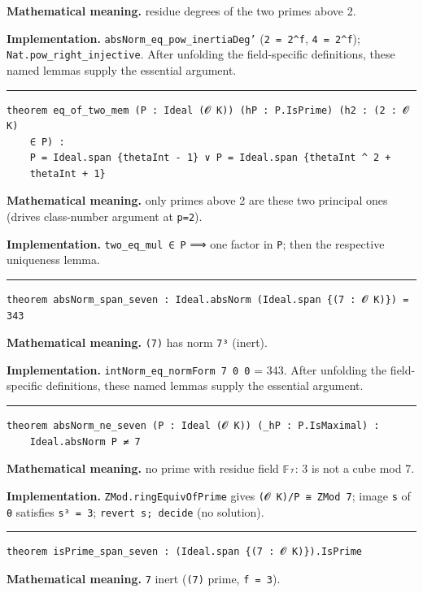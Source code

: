 \documentclass[UTF8,a4paper,11pt,fontset=fandol]{ctexart}
\theoremstyle{definition}
\newcommand{\statementsep}{\par\medskip\hrule\medskip}
\begin{document}
\noindent\textbf{Mathematical meaning.} residue degrees of the two primes above 2.\par
\noindent\textbf{Implementation.} \texttt{absNorm\_\allowbreak{}eq\_\allowbreak{}pow\_\allowbreak{}inertiaDeg'} (\texttt{2 = 2\textasciicircum{}f}, \texttt{4 = 2\textasciicircum{}f}); \texttt{Nat.\allowbreak{}pow\_\allowbreak{}right\_\allowbreak{}injective}. After unfolding the field-specific definitions, these named lemmas supply the essential argument.\par
\statementsep
\begin{verbatim}
theorem eq_of_two_mem (P : Ideal (𝓞 K)) (hP : P.IsPrime) (h2 : (2 : 𝓞 K)
    ∈ P) :
    P = Ideal.span {thetaInt - 1} ∨ P = Ideal.span {thetaInt ^ 2 +
    thetaInt + 1}
\end{verbatim}
\noindent\textbf{Mathematical meaning.} only primes above 2 are these two principal ones (drives class-number argument at \texttt{p=2}).\par
\noindent\textbf{Implementation.} \texttt{two\_\allowbreak{}eq\_\allowbreak{}mul ∈ P} ⟹ one factor in \texttt{P}; then the respective uniqueness lemma.\par
\statementsep
\begin{verbatim}
theorem absNorm_span_seven : Ideal.absNorm (Ideal.span {(7 : 𝓞 K)}) = 343
\end{verbatim}
\noindent\textbf{Mathematical meaning.} \texttt{(7)} has norm \texttt{7³} (inert).\par
\noindent\textbf{Implementation.} \texttt{intNorm\_\allowbreak{}eq\_\allowbreak{}normForm 7 0 0} = 343. After unfolding the field-specific definitions, these named lemmas supply the essential argument.\par
\statementsep
\begin{verbatim}
theorem absNorm_ne_seven (P : Ideal (𝓞 K)) (_hP : P.IsMaximal) :
    Ideal.absNorm P ≠ 7
\end{verbatim}
\noindent\textbf{Mathematical meaning.} no prime with residue field \texttt{𝔽₇}: 3 is not a cube mod 7.\par
\noindent\textbf{Implementation.} \texttt{ZMod.\allowbreak{}ringEquivOfPrime} gives \texttt{(𝓞 K)/\allowbreak{}P ≅ ZMod 7}; image \texttt{s} of \texttt{θ} satisfies \texttt{s³ = 3}; \texttt{revert s; decide} (no solution).\par
\statementsep
\begin{verbatim}
theorem isPrime_span_seven : (Ideal.span {(7 : 𝓞 K)}).IsPrime
\end{verbatim}
\noindent\textbf{Mathematical meaning.} \texttt{7} inert (\texttt{(7)} prime, \texttt{f = 3}).\par
\end{document}
